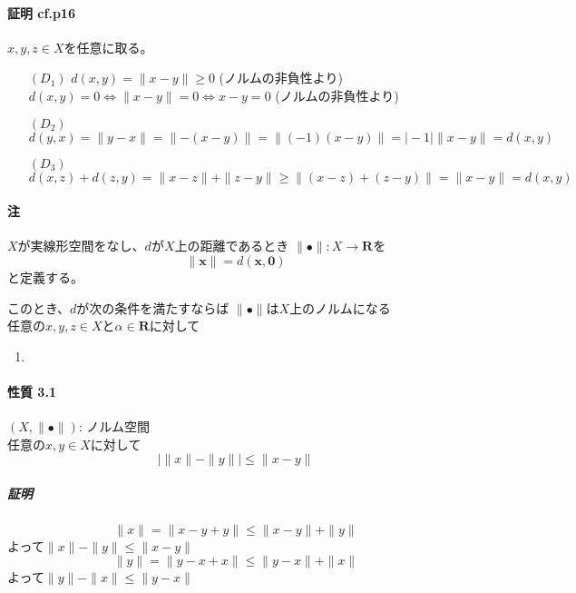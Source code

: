 \documentclass[12pt,a4paper]{article}
\begin{document}
        \paragraph{証明 cf.p16}
          $x, y, z \in X$を任意に取る。
          \begin{itemize}
            \item[$(D_1)$] $d(x, y) = \parallel x - y\parallel \geq 0$ (ノルムの非負性より) \\
              $d(x, y) = 0 \Leftrightarrow \parallel x -y \parallel = 0 \Leftrightarrow x - y = 0$ (ノルムの非負性より)
            \item[$(D_2)$]  $d(y, x) = \parallel y - x \parallel = \parallel - (x - y) \parallel = \parallel (-1) (x -y) \parallel = \mid -1 \mid \parallel x - y \parallel = d(x, y)$
            \item[$(D_3)$] $d(x, z) + d(z, y) = \parallel x - z \parallel + \parallel z - y \parallel \geq \parallel (x - z) + (z - y) \parallel = \parallel x - y \parallel = d(x, y)$
          \end{itemize}

        \paragraph{注}
          $X$が実線形空間をなし、$d$が$X$上の距離であるとき
          $\parallel \bullet \parallel : X \rightarrow \mathbf{R}$を
          \[\parallel \mathbf{x} \parallel = d(\mathbf{x}, \mathbf{0}) \]
          と定義する。

          このとき、$d$が次の条件を満たすならば
          $\parallel \bullet \parallel$は$X$上のノルムになる \\
          任意の$x, y, z \in X$と$\alpha \in \mathbf{R}$に対して
          \begin{enumerate}
            \item 
          \end{enumerate}

      \paragraph{性質 3.1}
        $(X, \parallel \bullet \parallel)$: ノルム空間 \\
        任意の$x,y \in X$に対して
        \[ \mid \parallel x \parallel - \parallel y \parallel \mid \leq \parallel x - y\parallel \]
      \subparagraph{証明}
        \[ \parallel x \parallel = \parallel x - y + y \parallel \leq \parallel x - y \parallel + \parallel y \parallel \]
        よって$\parallel x \parallel - \parallel y \parallel \leq \parallel x - y \parallel$\\
        \[\parallel y \parallel = \parallel y - x + x \parallel \leq \parallel y - x \parallel + \parallel x \parallel \]
        よって$\parallel y \parallel - \parallel x \parallel \leq \parallel y - x \parallel$
\end{document}
